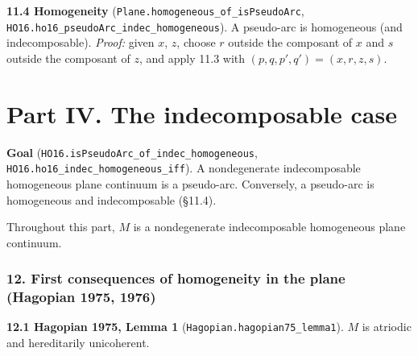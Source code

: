 \documentclass[11pt]{article}
\newcommand{\lean}[1]{\texttt{#1}}
\begin{document}
\textbf{11.4 Homogeneity} (\lean{Plane.\hspace{0pt}homogeneous\_\hspace{0pt}of\_\hspace{0pt}isPseudoArc}, \lean{HO16.\hspace{0pt}ho16\_\hspace{0pt}pseudoArc\_\hspace{0pt}indec\_\hspace{0pt}homogeneous}). A pseudo-arc is homogeneous (and indecomposable). \emph{Proof:} given $x$, $z$, choose $r$ outside the composant of $x$ and $s$ outside the composant of $z$, and apply 11.3 with $(p, q, p', q') = (x, r, z, s)$.

\bigskip

\part*{Part IV. The indecomposable case}

\textbf{Goal} (\lean{HO16.\hspace{0pt}isPseudoArc\_\hspace{0pt}of\_\hspace{0pt}indec\_\hspace{0pt}homogeneous}, \lean{HO16.\hspace{0pt}ho16\_\hspace{0pt}indec\_\hspace{0pt}homogeneous\_\hspace{0pt}iff}). A nondegenerate indecomposable homogeneous plane continuum is a pseudo-arc. Conversely, a pseudo-arc is homogeneous and indecomposable (\S{}11.4).

Throughout this part, $M$ is a nondegenerate indecomposable homogeneous plane continuum.

\section*{12. First consequences of homogeneity in the plane (Hagopian 1975, 1976)}

\textbf{12.1 Hagopian 1975, Lemma 1} (\lean{Hagopian.\hspace{0pt}hagopian75\_\hspace{0pt}lemma1}). $M$ is atriodic and hereditarily unicoherent.
\end{document}
